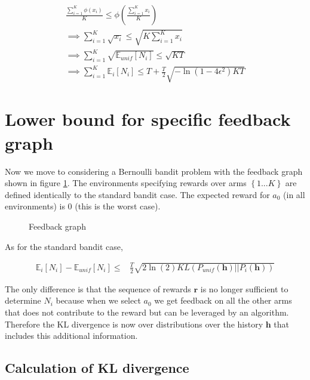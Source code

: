 \documentclass{article}
\newcommand{\E}{\mathbb E}
\newcommand{\set}[1]{\left\{#1\right\}}
\newcommand{\eqn}[1]{\begin{align}#1\end{align}}
\renewcommand{\Pi}[1]{P_i\left( #1 \right)}
\newcommand{\Pu}[1]{P_{unif}\left( #1 \right)}
\newcommand{\Ei}[1]{\E_i\left[ #1 \right]}
\newcommand{\Eu}[1]{\E_{unif}\left[ #1 \right]}
\renewcommand{\r}{\boldsymbol{r}}
\newcommand{\kl}[2]{KL\left(#1 || #2 \right)}
\theoremstyle{plain}
\theoremstyle{definition}
\begin{document}
\eqn{
\frac{\sum_{i=1}^K \phi(x_i)}{K} \leq \phi \left(\frac{\sum_{i=1}^K x_i}{K} \right) \\
\implies \sum_{i=1}^K \sqrt{x_i} \leq \sqrt{K\sum_{i=1}^K x_i}\\
\implies  \sum_{i=1}^K \sqrt{\Eu{N_i}} \leq \sqrt{KT} \\
\implies \sum_{i=1}^K\Ei{N_i} \leq T+ \frac{T}{2} \sqrt{-\ln(1-4\epsilon^2)KT}
}

\section{Lower bound for specific feedback graph}

Now we move to considering a Bernoulli bandit problem with the feedback graph shown in figure \ref{fig:feedbackgraph}. The environments specifying rewards over arms $\set{1...K}$ are defined identically to the standard bandit case. The expected reward for $a_0$ (in all environments) is $0$ (this is the worst case).


\begin{figure}[h]
\centering
\caption{Feedback graph}
\label{fig:feedbackgraph}
\end{figure}

As for the standard bandit case,

\eqn{
\Ei{N_i} -\Eu{N_i} \leq & \frac{T}{2}\sqrt{2\ln({2})\kl{\Pu{\boldsymbol{h}}}{\Pi{\boldsymbol{h}}}} 
}

The only difference is that the sequence of rewards $\r$ is no longer sufficient to determine $N_i$ because when we select $a_0$ we get feedback on all the other arms that does not contribute to the reward but can be leveraged by an algorithm. Therefore the KL divergence is now over distributions over the history $\boldsymbol{h}$ that includes this additional information. 

\subsection{Calculation of KL divergence}
\end{document}
